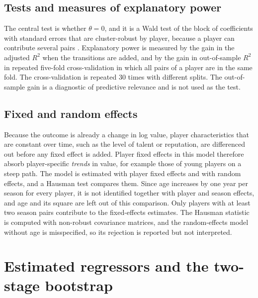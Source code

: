 \subsection{Tests and measures of explanatory power}

The central test is whether $\theta=0$, and it is a Wald test of the block of coefficients with standard errors that are cluster-robust by player, because a player can contribute several pairs \cite{cameron2015practitioner}. Explanatory power is measured by the gain in the adjusted $R^2$ when the transitions are added, and by the gain in out-of-sample $R^2$ in repeated five-fold cross-validation in which all pairs of a player are in the same fold. The cross-validation is repeated 30 times with different splits. The out-of-sample gain is a diagnostic of predictive relevance and is not used as the test.

\subsection{Fixed and random effects}

Because the outcome is already a change in log value, player characteristics that are constant over time, such as the level of talent or reputation, are differenced out before any fixed effect is added. Player fixed effects in this model therefore absorb player-specific \emph{trends} in value, for example those of young players on a steep path. The model is estimated with player fixed effects and with random effects, and a Hausman test \cite{hausman1978specification} compares them. Since age increases by one year per season for every player, it is not identified together with player and season effects, and age and its square are left out of this comparison. Only players with at least two season pairs contribute to the fixed-effects estimates. The Hausman statistic is computed with non-robust covariance matrices, and the random-effects model without age is misspecified, so its rejection is reported but not interpreted.

\section{Estimated regressors and the two-stage bootstrap}
\label{sec:method-bootstrap}

